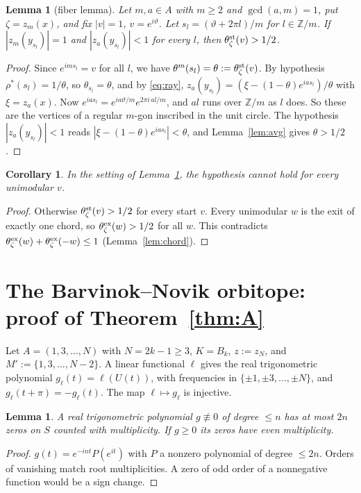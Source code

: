 \documentclass[11pt]{amsart}
\newtheorem{lemma}[theorem]{Lemma}
\newtheorem{corollary}[theorem]{Corollary}
\theoremstyle{remark}
\newcommand{\Z}{\mathbb{Z}}
\begin{document}
\begin{lemma}[fiber lemma]\label{lem:fiber}
Let $m,a\in A$ with $m\ge2$ and $\gcd(a,m)=1$, put $\zeta=z_m(x)$, and fix $|v|=1$, $v=e^{i\vartheta}$. Let $s_l=(\vartheta+2\pi l)/m$ for $l\in\Z/m$.
If $|z_m(y_{s_l})|=1$ and $|z_a(y_{s_l})|<1$ for every $l$, then $\theta^{\rm st}_\zeta(v)>1/2$.
\end{lemma}
\begin{proof}
Since $e^{ims_l}=v$ for all $l$, we have $\theta^m(s_l)=\theta:=\theta^{\rm st}_\zeta(v)$. By hypothesis $\rho^\ast(s_l)=1/\theta$, so $\theta_{s_l}=\theta$, and by
\eqref{eq:ray}, $z_a(y_{s_l})=(\xi-(1-\theta)e^{ias_l})/\theta$ with $\xi=z_a(x)$. Now $e^{ias_l}=e^{ia\vartheta/m}e^{2\pi i\,al/m}$, and $al$ runs over $\Z/m$ as
$l$ does. So these are the vertices of a regular $m$-gon inscribed in the unit circle. The hypothesis $|z_a(y_{s_l})|<1$ reads
$|\xi-(1-\theta)e^{ias_l}|<\theta$, and Lemma~\ref{lem:avg} gives $\theta>1/2$.
\end{proof}

\begin{corollary}\label{cor:fiber}
In the setting of Lemma~\ref{lem:fiber}, the hypothesis cannot hold for every unimodular $v$.
\end{corollary}
\begin{proof}
Otherwise $\theta^{\rm st}_\zeta(v)>1/2$ for every start $v$. Every unimodular $w$ is the exit of exactly one chord, so $\theta^{\rm ex}_\zeta(w)>1/2$ for all $w$.
This contradicts $\theta^{\rm ex}_\zeta(w)+\theta^{\rm ex}_\zeta(-w)\le1$ (Lemma~\ref{lem:chord}).
\end{proof}

\section{The Barvinok--Novik orbitope: proof of Theorem~\ref{thm:A}}

Let $A=(1,3,\dots,N)$ with $N=2k-1\ge3$, $K=B_k$, $z:=z_N$, and $M':=\{1,3,\dots,N-2\}$. A linear functional $\ell$ gives the real trigonometric polynomial
$g_\ell(t)=\ell(U(t))$, with frequencies in $\{\pm1,\pm3,\dots,\pm N\}$, and $g_\ell(t+\pi)=-g_\ell(t)$. The map $\ell\mapsto g_\ell$ is injective.

\begin{lemma}\label{lem:zeros}
A real trigonometric polynomial $g\not\equiv0$ of degree $\le n$ has at most $2n$ zeros on $S$ counted with multiplicity. If $g\ge0$ its zeros have even multiplicity.
\end{lemma}
\begin{proof}
$g(t)=e^{-int}P(e^{it})$ with $P$ a nonzero polynomial of degree $\le2n$. Orders of vanishing match root multiplicities. A zero of odd order of a nonnegative
function would be a sign change.
\end{proof}
\end{document}
